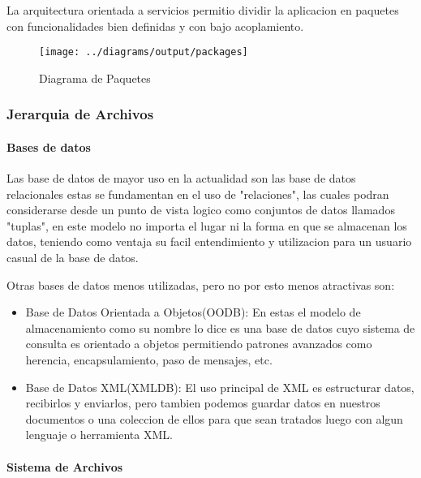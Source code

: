 La arquitectura orientada a servicios permitio dividir la aplicacion en paquetes con funcionalidades bien definidas y con bajo acoplamiento.

\begin{landscape}
\begin{figure}
 \centering
 \texttt{[image: ../diagrams/output/packages]}
 \caption{Diagrama de Paquetes}
 \label{diagrama:paquetes}
\end{figure}
\end{landscape}


\subsubsection{Jerarquia de Archivos}

\paragraph{Bases de datos}

Las base de datos de mayor uso en la actualidad son las base de datos relacionales estas se fundamentan en el uso de "relaciones", las cuales podran considerarse desde un punto de vista logico como conjuntos de datos llamados "tuplas", en este modelo no importa el lugar ni la forma en que se almacenan los datos, teniendo como ventaja su facil entendimiento y utilizacion para un usuario casual de la base de datos.

Otras bases de datos menos utilizadas, pero no por esto menos atractivas son:

\begin{itemize}

	\item Base de Datos Orientada a Objetos(OODB): En estas el modelo de almacenamiento como su nombre lo dice es una base de datos cuyo sistema de consulta es orientado a objetos permitiendo patrones avanzados como herencia, encapsulamiento, paso de mensajes, etc.
	
	\item Base de Datos XML(XMLDB): El uso principal de XML es estructurar datos, recibirlos y enviarlos, pero tambien podemos guardar datos en nuestros documentos o una coleccion de ellos para que sean tratados luego con algun lenguaje o herramienta XML.

\end{itemize}


\paragraph{Sistema de Archivos}

